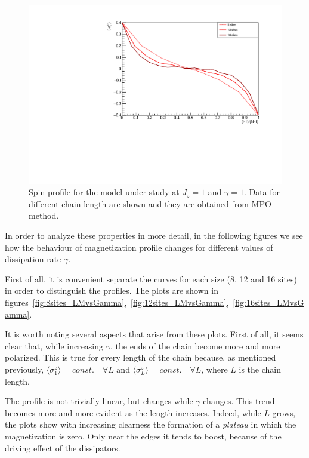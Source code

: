 \begin{figure}[H]
    \centering
    \includegraphics[scale=0.7]{Figures/NORM_LM_comparisonVSsize.pdf}
    \captionsetup{width=1.\linewidth}
    \caption{Spin profile for the model under study at $J_z = 1$ and $\gamma=1$. Data for different chain length are shown and they are obtained from MPO method.}
    \label{fig:LM_comparisonVSsizeJz1Gamma1}
\end{figure}

In order to analyze these properties in more detail, in the following figures we see how the behaviour of magnetization profile changes for different values of dissipation rate $\gamma$. 

First of all, it is convenient separate the curves for each size (8, 12 and 16 sites) in order to distinguish the profiles. The plots are shown in figures~\ref{fig:8sites_LMvsGamma},~\ref{fig:12sites_LMvsGamma},~\ref{fig:16sites_LMvsGamma}.

It is worth noting several aspects that arise from these plots. First of all, it seems clear that, while increasing $\gamma$, the ends of the chain become more and more polarized. This is true for every length of the chain because, as mentioned previously, $\langle\sigma^z_1\rangle = const. \quad \forall L$ and $\langle\sigma^z_L\rangle = const. \quad \forall L$, where $L$ is the chain length.

The profile is not trivially linear, but changes while $\gamma$ changes. This trend becomes more and more evident as the length increases. Indeed, while $L$ grows, the plots show with increasing clearness the formation of a \emph{plateau} in which the magnetization is zero. Only near the edges it tends to boost, because of the driving effect of the dissipators.


